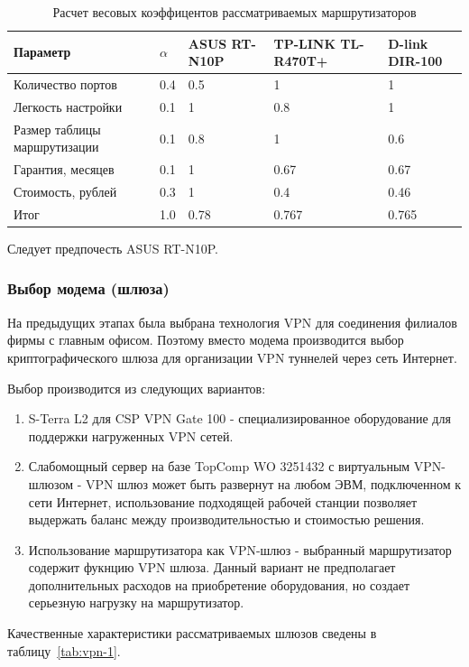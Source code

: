 \documentclass[russian,utf8,emptystyle]{eskdtext}
\begin{document}
\begin{longtable}{p{7cm}|p{1cm}|p{2cm}|p{2cm}|p{2cm}}
\caption{Расчет весовых коэффицентов рассматриваемых маршрутизаторов}
\label{tab:routers-2} \\
Параметр                     & $\alpha$ & ASUS RT-N10P & TP-LINK TL-R470T+ & D-link DIR-100 \\ 
\hline 
Количество портов            & 0.4      & 0.5       & 1      & 1  \\ 
Легкость настройки           & 0.1      & 1         & 0.8    & 1  \\ 
Размер таблицы маршрутизации & 0.1      & 0.8       & 1      & 0.6  \\ 
Гарантия, месяцев            & 0.1      & 1         & 0.67   & 0.67  \\ 
Стоимость, рублей            & 0.3      & 1         & 0.4    & 0.46 \\
\hline
Итог						 & 1.0      & 0.78      & 0.767  & 0.765    
\end{longtable}

Следует предпочесть ASUS RT-N10P.

\clearpage
\subsubsection{Выбор модема (шлюза)}
На предыдущих этапах была выбрана технология VPN для соединения филиалов фирмы с главным офисом. Поэтому вместо модема производится выбор криптографического шлюза для организации VPN туннелей через сеть Интернет.

Выбор производится из следующих вариантов:
\begin{enumerate}[label=\arabic*.]
\item S-Terra L2 для CSP VPN Gate 100 - специализированное оборудование для поддержки нагруженных VPN сетей.
\item Слабомощный сервер на базе TopComp WO 3251432 с виртуальным VPN-шлюзом - VPN шлюз может быть развернут на любом ЭВМ, подключенном к сети Интернет, использование подходящей рабочей станции позволяет выдержать баланс между производительностью и стоимостью решения.
\item Использование маршрутизатора как VPN-шлюз - выбранный маршрутизатор содержит фукнцию VPN шлюза. Данный вариант не предполагает дополнительных расходов на приобретение оборудования, но создает серьезную нагрузку на маршрутизатор.
\end{enumerate}

Качественные характеристики рассматриваемых шлюзов сведены в таблицу~\ref{tab:vpn-1}.
\end{document}
